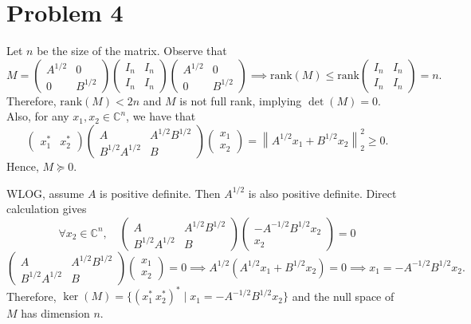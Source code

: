 \documentclass[11pt]{article}
\theoremstyle{plain}
\theoremstyle{definition}
\theoremstyle{remark}
\newcommand{\norm}[1]{\left\lVert #1 \right\rVert}
\newcommand{\C}{\mathbb{C}}
\def\-#1{\mathrm{#1}} %
\begin{document}
\section*{Problem 4}
Let $n$ be the size of the matrix.
Observe that 
$$
    M = \begin{pmatrix}
        A^{1/2} & 0
        \\0 & B^{1/2}
    \end{pmatrix}\begin{pmatrix}
        I_n & I_n
        \\I_n & I_n
    \end{pmatrix}\begin{pmatrix}
        A^{1/2} & 0
        \\0 & B^{1/2}
    \end{pmatrix} \implies \-{rank}(M) \leq \-{rank}\begin{pmatrix}
        I_n & I_n
        \\I_n & I_n
    \end{pmatrix} = n .
$$
Therefore, $\-{rank}(M) < 2n$ and $M$ is not full rank, implying $\det(M) = 0$.
Also, for any $x_1,x_2\in \C^n$, we have that
$$
    \begin{pmatrix}
        x_1^* & x_2^*
    \end{pmatrix}\begin{pmatrix}
        A & A^{1/2}B^{1/2}
        \\B^{1/2}A^{1/2} & B
    \end{pmatrix}\begin{pmatrix}
        x_1 \\ x_2
    \end{pmatrix}
    = \norm{A^{1/2}x_1 + B^{1/2}x_2}_{2}^2 \geq 0.
$$
Hence, $M\succeq 0$.

WLOG, assume $A$ is positive definite.
Then $A^{1/2}$ is also positive definite.
Direct calculation gives
$$
    \forall x_2\in \C^n, \quad\begin{pmatrix}
        A & A^{1/2}B^{1/2}
        \\B^{1/2}A^{1/2} & B
    \end{pmatrix}\begin{pmatrix}
        -A^{-1/2}B^{1/2}x_2
        \\x_2
    \end{pmatrix}  = 0
$$
$$
    \begin{pmatrix}
        A & A^{1/2}B^{1/2}
        \\B^{1/2}A^{1/2} & B
    \end{pmatrix} \begin{pmatrix}
        x_1
        \\x_2
    \end{pmatrix} = 0
    \implies 
    A^{1/2}(A^{1/2}x_1 + B^{1/2}x_2) = 0
    \implies x_1 = -A^{-1/2}B^{1/2}x_2 .
$$
Therefore, $\ker(M) = \{(x_1^*\ x_2^*)^*\mid x_1 = -A^{-1/2}B^{1/2}x_2\}$ and the null space of $M$ has dimension $n$.
\end{document}
